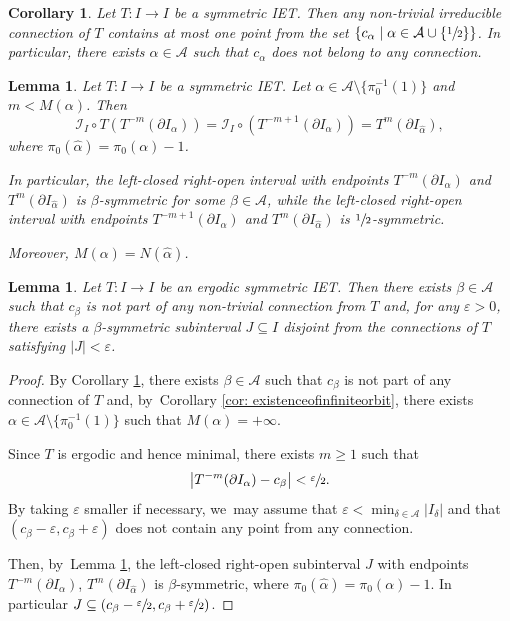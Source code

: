 \documentclass[10pt,a4paper]{article}
\let\epsilon\varepsilon
\theoremstyle{plain}
\newtheorem{lemma}[theorem]{Lemma}
\newtheorem{corollary}[theorem]{Corollary}
\theoremstyle{definition}
\newcommand{\A}{\mathcal{A}}
\newcommand{\I}{\mathcal{I}}
\begin{document}
\begin{corollary}
\label{cor:centers_connections}
Let $T: I \to I$ be a symmetric IET. Then any non-trivial irreducible connection of $T$ contains at most one point from the set $\left\{c_\alpha \mid \alpha \in \A \cup \{\sfrac{1}{2}\} \right\}$. In particular, there exists $\alpha \in \A$ such that $c_\alpha$ does not belong to any connection.
\end{corollary}

\begin{lemma}\label{lem: sym_endpoints}
{Let $T : I \to I$ be a symmetric IET.}
Let $\alpha\in\mathcal A\setminus\{\pi_0^{-1}(1)\}$ and $m< M(\alpha)$. Then
\begin{equation}\label{eq: connections}
\I_I\circ T(T^{-m}(\partial I_{\alpha}))={\I_I\circ (T^{-m+1}(\partial I_{\alpha}))}=T^m(\partial I_{\hat\alpha}),
\end{equation}
where $\pi_0(\hat\alpha)=\pi_0(\alpha)-1$.

In particular, the left-closed right-open interval with endpoints $T^{-m}(\partial I_{\alpha})$ and $T^m(\partial I_{\hat\alpha})$ is {$\beta$-symmetric for some $\beta\in\A$, while the left-closed right-open interval with endpoints $T^{-m+1}(\partial I_{\alpha})$ and $T^m(\partial I_{\hat\alpha})$ is $\sfrac{1}{2}$-symmetric}.

Moreover, $M(\alpha)= N(\hat\alpha)$.
\end{lemma}

\begin{lemma}
\label{lem:sym_int_disjoint}
Let $T: I \to I$ be an ergodic symmetric IET. Then there exists $\beta \in \A$ such that $c_\beta$ is not part of any non-trivial connection from $T$ and, for any $\epsilon > 0$, there exists a $\beta$-symmetric subinterval $J\subseteq I$ disjoint from the connections of $T$ satisfying $|J| < \epsilon$.
\end{lemma}

\begin{proof}
By Corollary \ref{cor:centers_connections}, there exists $\beta \in \A$ such that $c_\beta$ is not part of any connection of $T$ and, by~Corollary \ref{cor: existenceofinfiniteorbit}, there exists $\alpha \in \A \setminus \{\pi_0^{-1}(1)\}$ such that $M(\alpha) = +\infty$.

Since $T$ is ergodic and hence minimal, there exists $m \geq 1$ such that
\[
\big|T^{-m}(\partial I_\alpha) - c_\beta \big| < \sfrac{\epsilon}{2}.
\]
By taking $\epsilon$ smaller if necessary, we~may assume that $\epsilon < \min_{\delta \in \A} |I_\delta|$ and that $(c_\beta - \epsilon, c_\beta + \epsilon)$ does not contain any point from any connection.

Then, by~Lemma \ref{lem: sym_endpoints}, the left-closed right-open subinterval $J$ with endpoints $T^{-m}(\partial I_\alpha)$, $T^{m}(\partial I_{\hat \alpha})$ is $\beta$-symmetric, where $\pi_0(\hat \alpha) = \pi_0(\alpha) - 1$. In particular $J \subseteq (c_\beta - \sfrac{\epsilon}{2}, c_\beta + \sfrac{\epsilon}{2})$.
\end{proof}
\end{document}
